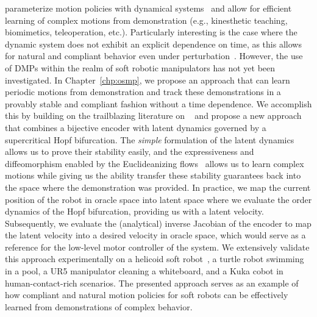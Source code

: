  parameterize motion policies with dynamical systems~\cite{ijspeert2013dynamical, saveriano2023dynamic} and allow for efficient learning of complex motions from demonstration (e.g., kinesthetic teaching, biomimetics, teleoperation, etc.).
Particularly interesting is the case where the dynamic system does not exhibit an explicit dependence on time, as this allows for natural and compliant behavior even under perturbation~\cite{ijspeert2013dynamical}.
However, the use of \glspl{DMP} within the realm of soft robotic manipulators has not yet been investigated.
In Chapter~\ref{chp:osmp}, we propose an approach that can learn periodic motions from demonstration and track these demonstrations in a provably stable and compliant fashion without a time dependence.
We accomplish this by building on the trailblazing literature on ~\cite{ijspeert2013dynamical, rana2020euclideanizing, perez2023stable} and propose a new approach that combines a bijective encoder with latent dynamics governed by a supercritical Hopf bifurcation. The \emph{simple} formulation of the latent dynamics allows us to prove their stability easily, and the expressiveness and diffeomorphism enabled by the Euclideanizing flows~\cite{dinh2016density, rana2020euclideanizing} allows us to learn complex motions while giving us the ability transfer these stability guarantees back into the space where the demonstration was provided.
In practice, we map the current position of the robot in oracle space into latent space where we evaluate the  order dynamics of the Hopf bifurcation, providing us with a latent velocity.
Subsequently, we evaluate the (analytical) inverse Jacobian of the encoder to map the latent velocity into a desired velocity in oracle space, which would serve as a reference for the low-level motor controller of the system.
We extensively validate this approach experimentally on a helicoid soft robot~\cite{guan2023trimmed}, a turtle robot swimming in a pool, a UR5 manipulator cleaning a whiteboard, and a Kuka cobot in human-contact-rich scenarios.
The presented approach serves as an example of how compliant and natural motion policies for soft robots can be effectively learned from demonstrations of complex behavior.
